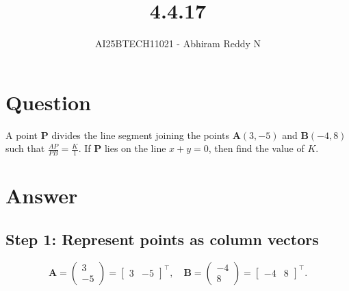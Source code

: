 \documentclass[journal]{IEEEtran}
\begin{document}

\vspace{3cm}

\title{4.4.17}
\author{AI25BTECH11021 - Abhiram Reddy N}
{\let\newpage\relax\maketitle}

\renewcommand{\thefigure}{\theenumi}
\renewcommand{\thetable}{\theenumi}
\setlength{\intextsep}{10pt} %


\renewcommand{\thetable}{\theenumi}


\section*{\textbf{Question}}
A point \(\mathbf{P}\) divides the line segment joining the points \(\mathbf{A}(3, -5)\) and \(\mathbf{B}(-4, 8)\) such that \(\frac{AP}{PB} = \frac{K}{1}\). If \(\mathbf{P}\) lies on the line \(x + y = 0\), then find the value of \(K\).

\section*{\textbf{Answer}}

\subsection*{\textbf{Step 1: Represent points as column vectors}}
\[
\mathbf{A} = \begin{pmatrix} 3 \\ -5 \end{pmatrix} = \begin{bmatrix} 3 & -5 \end{bmatrix}^\top, \quad 
\mathbf{B} = \begin{pmatrix} -4 \\ 8 \end{pmatrix} = \begin{bmatrix} -4 & 8 \end{bmatrix}^\top.
\]
\end{document}
